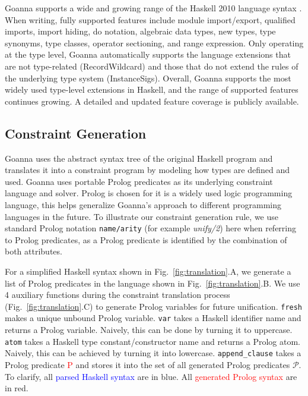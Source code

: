 \documentclass[pdflatex,lineno,sn-nature,Numbered]{sn-jnl}%
\begin{document}
    Goanna supports a wide and growing range of the Haskell 2010 language syntax \cite{Simon_Marlow2010-lg}. When writing, fully supported features include module import/export, qualified imports, import hiding, do notation, algebraic data types, new types, type synonyms, type classes, operator sectioning, and range expression. Only operating at the type level, Goanna automatically supports the language extensions that are not type-related (RecordWildcard) and those that do not extend the rules of the underlying type system (InstanceSigs). Overall, Goanna supports the most widely used type-level extensions in Haskell, and the range of supported features continues growing.  A detailed and updated feature coverage \cite{Fu2023-rp} is publicly available.

    \subsection{Constraint Generation} \label{sub:translation}

    Goanna uses the abstract syntax tree of the original Haskell program and translates it into a constraint program by modeling how types are defined and used. Goanna uses portable Prolog predicates \cite{Wielemaker2011-sr} as its underlying constraint language and solver. Prolog is chosen for it is a widely used logic programming language, this helps generalize Goanna's approach to different programming languages in the future. To illustrate our constraint generation rule, we use standard Prolog notation \texttt{name/arity} (for example {\it unify/2}) here when referring to Prolog predicates, as a Prolog predicate is identified by the combination of both attributes. 

For a simplified Haskell syntax shown in Fig.~\ref{fig:translation}.A, we generate a list of Prolog predicates in the language shown in Fig.~\ref{fig:translation}.B. We use 4 auxiliary functions during the constraint translation process (Fig.~\ref{fig:translation}.C) to generate Prolog variables for future unification. \texttt{fresh} makes a unique unbound Prolog variable. \texttt{var} takes a Haskell identifier name and returns a Prolog variable. Naively, this can be done by turning it to uppercase. \texttt{atom} takes a Haskell type constant/constructor name and returns a Prolog atom. Naively, this can be achieved by turning it into lowercase. \texttt{append\_clause} takes a Prolog predicate \textcolor{red}{P} and stores it into the set of all generated Prolog predicates $\mathcal{P}$. To clarify, all \textcolor{blue}{parsed Haskell syntax} are in blue. All \textcolor{red}{generated Prolog syntax} are in red. 
    
\end{document}
